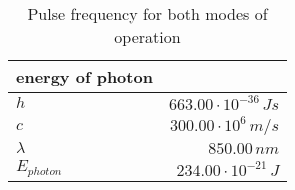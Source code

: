 \begin{table}[H]
\centering
\caption{Pulse frequency for both modes of operation}
\label{tab:energy_of_photon}
\begin{tabular}{|l|r|}\hline
    \textbf{energy of photon} & \\
    \hline 
    $h$ & $663.00\cdot10^{-36}\,Js$ \\
    $c$ & $300.00\cdot10^6\,m/s$ \\
    $\lambda$ & $850.00\,n m$ \\
    $E_{photon}$ & $234.00\cdot10^{-21}\,J$ \\
    \hline 
\end{tabular}
\end{table}

